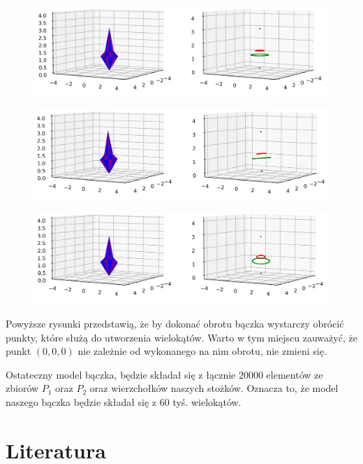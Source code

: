 \documentclass[a4paper,twoside,11pt,reqno]{mwrep}
\theoremstyle{plain} \newtheorem{twr}{Twierdzenie}
\theoremstyle{plain} \newtheorem{lem}{Lemat}
\theoremstyle{definition} \newtheorem{defi}{Definicja}
\theoremstyle{remark} \newtheorem*{wni}{Wniosek}
\theoremstyle{definition} \newtheorem{uwaga}{Uwaga}
\theoremstyle{definition}\newtheorem{prz}{Przykład}
\begin{document}
\begin{figure}[h]
\begin{center}
\includegraphics[width=10 cm]{0.png}
\end{center}
\end{figure}
\newpage
\begin{figure}[h]
\begin{center}
\includegraphics[width=10 cm]{1.png}
\end{center}
\end{figure}
\begin{figure}[h]
\begin{center}
\includegraphics[width=10 cm]{2.png}
\end{center}
\end{figure}
Powyższe rysunki przedstawią, że by dokonać obrotu bączka wystarczy obrócić 
punkty, które służą do utworzenia wielokątów. Warto w tym miejscu zauważyć,
że punkt $(0,0,0)$ nie zależnie od wykonanego na nim obrotu, nie zmieni się.

Ostateczny model bączka, będzie składał się z łącznie $20000$ elementów ze zbiorów $P_1$ oraz $P_2$ oraz wierzchołków naszych stożków. Oznacza to, że model naszego bączka będzie składał się z $60$ tyś. wielokątów.
\chapter{Literatura}
\end{document}
